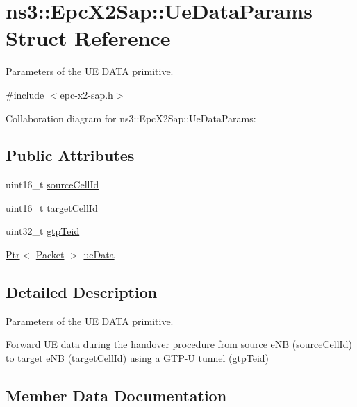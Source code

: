 \hypertarget{structns3_1_1EpcX2Sap_1_1UeDataParams}{}\section{ns3\+:\+:Epc\+X2\+Sap\+:\+:Ue\+Data\+Params Struct Reference}
\label{structns3_1_1EpcX2Sap_1_1UeDataParams}


Parameters of the UE D\+A\+TA primitive.  




{\ttfamily \#include $<$epc-\/x2-\/sap.\+h$>$}



Collaboration diagram for ns3\+:\+:Epc\+X2\+Sap\+:\+:Ue\+Data\+Params\+:
\subsection*{Public Attributes}
\begin{DoxyCompactItemize}
\item 
uint16\+\_\+t \hyperlink{structns3_1_1EpcX2Sap_1_1UeDataParams_aa7874679502767d1cad719fb7dd4a4bb}{source\+Cell\+Id}
\item 
uint16\+\_\+t \hyperlink{structns3_1_1EpcX2Sap_1_1UeDataParams_ae1b898ec9d57743aa53989ef3e30115a}{target\+Cell\+Id}
\item 
uint32\+\_\+t \hyperlink{structns3_1_1EpcX2Sap_1_1UeDataParams_ad0fbe68f55aa61246e0f8f4fee0db5de}{gtp\+Teid}
\item 
\hyperlink{classns3_1_1Ptr}{Ptr}$<$ \hyperlink{classns3_1_1Packet}{Packet} $>$ \hyperlink{structns3_1_1EpcX2Sap_1_1UeDataParams_aa194f663de494c1bf03bd42e51b81a8e}{ue\+Data}
\end{DoxyCompactItemize}


\subsection{Detailed Description}
Parameters of the UE D\+A\+TA primitive. 

Forward UE data during the handover procedure from source e\+NB (source\+Cell\+Id) to target e\+NB (target\+Cell\+Id) using a G\+T\+P-\/U tunnel (gtp\+Teid) 

\subsection{Member Data Documentation}
